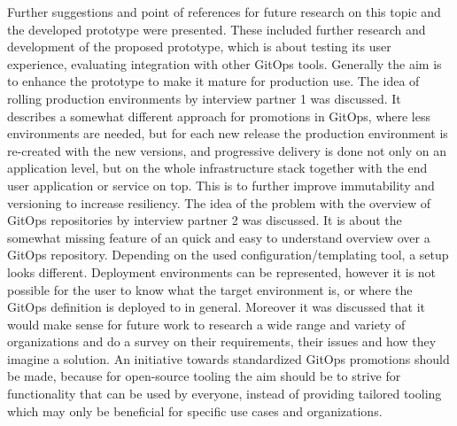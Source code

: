 Further suggestions and point of references for future research on this topic
and the developed prototype were presented.
These included
further research and development of the proposed prototype,
which is about testing its user experience, evaluating integration with
other GitOps tools. Generally the aim is to enhance the prototype
to make it mature for production use.
The idea of rolling production environments by interview partner 1 was discussed.
It describes a somewhat different approach for promotions in GitOps,
where less environments are needed, but for each new release the 
production environment is re-created with the new versions, and
progressive delivery is done not only on an application level, but on the whole
infrastructure stack together with the end user application or service on top.
This is to further improve immutability and versioning to increase resiliency.
The idea of the problem with the overview of GitOps repositories by interview partner 2
was discussed.
It is about the somewhat missing feature of an quick and easy to understand overview over a GitOps repository.
Depending on the used configuration/templating tool, a setup looks different.
Deployment environments can be represented, however it is not possible for the user
to know what the target environment is, or where the GitOps definition is deployed to in general.
Moreover it was discussed that it would make sense for future work
to research a wide range and variety of organizations and do a survey on
their requirements, their issues and how they imagine a solution.
An initiative towards standardized GitOps promotions should be made,
because for open-source tooling the aim should be to strive for functionality
that can be used by everyone,
instead of providing tailored tooling which may only be beneficial for specific use cases
and organizations.




























